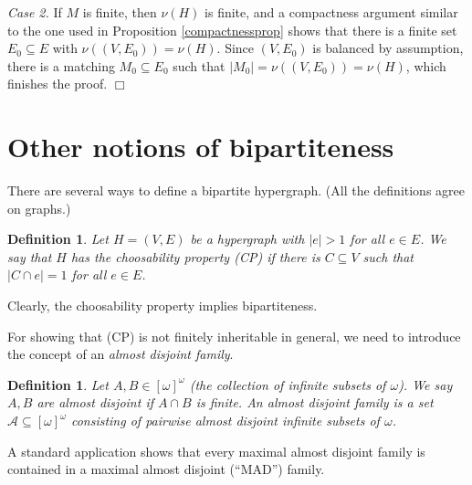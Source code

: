 \documentclass[12pt]{amsart}
\newtheorem{definition}[lemma]{\bf Definition}
\newcommand{\proofend}{{\hfill $\Box$}}
\begin{document}
{\em Case 2.} If $M$ is finite, then $\nu(H)$ is finite, and a 
compactness argument similar to the one used in Proposition
\ref{compactnessprop} shows that there is a finite set 
$E_0\subseteq E$ with $\nu((V, E_0)) = \nu(H)$. Since
$(V, E_0)$ is balanced by assumption, there is a matching $M_0
\subseteq E_0$ such that $|M_0| = \nu((V, E_0)) = \nu(H)$, which
finishes the proof. \proofend

\section{Other notions of bipartiteness}
There are several ways to define a bipartite hypergraph. 
(All the definitions agree on graphs.)

\begin{definition} {\em 
Let $H= (V, E)$ be a hypergraph with $|e|>1$ for all $e\in E$. We say 
that $H$ has the {\em choosability
property} (CP) if there is $C \subseteq V$ such that $|C \cap e| = 1$
for all $e\in E$.
}
\end{definition}
Clearly, the choosability property implies bipartiteness. 

For showing that (CP) is not finitely inheritable in general,
we need to introduce the concept of an {\em  
almost disjoint family}.

\begin{definition}{\em
Let $A,B\in [\omega]^\omega$ (the collection of infinite subsets of $\omega$).
We say $A, B$ are {\em almost disjoint} if $A\cap B$ is finite. An 
{\em almost disjoint family} is a set ${\mathcal A} \subseteq [\omega]^\omega$
consisting of pairwise almost disjoint infinite subsets of $\omega$.
}
\end{definition}

A standard application shows that every maximal almost disjoint family
is contained in a maximal almost disjoint (``MAD'') family. 
\end{document}
